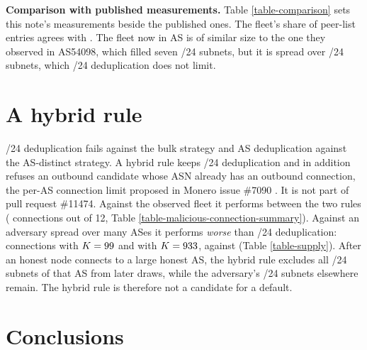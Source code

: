 \documentclass[english]{mrl}
\theoremstyle{plain}
\begin{document}
\textbf{Comparison with published measurements.} Table \ref{table-comparison} sets this note's measurements beside the published ones. The fleet's share of peer-list entries agrees with \cite{Kopyciok2026}. The fleet now in AS\spyTopAsnNew{} is of similar size to the one they observed in AS54098, which filled seven /24 subnets, but it is spread over \spyTwentyFourNew{} /24 subnets, which /24 deduplication does not limit.



\section{A hybrid rule\label{sec:hybrid}}

/24 deduplication fails against the bulk strategy and AS deduplication against the AS-distinct strategy. A hybrid rule keeps /24 deduplication and in addition refuses an outbound candidate whose ASN already has an outbound connection, the per-AS connection limit proposed in Monero issue \#7090 \cite{MoneroIssue7090}. It is not part of pull request \#11474. Against the observed fleet it performs between the two rules (\simNewHybridEightyMean{} connections out of 12, Table \ref{table-malicious-connection-summary}). Against an adversary spread over many ASes it performs \emph{worse} than /24 deduplication: \supHybridKXCIX{} connections with $K=99$ and \supHybridKCMXXXIII{} with $K=933$, against \supSubnetKIX{} (Table \ref{table-supply}). After an honest node connects to a large honest AS, the hybrid rule excludes all /24 subnets of that AS from later draws, while the adversary's /24 subnets elsewhere remain. The hybrid rule is therefore not a candidate for a default.

\section{Conclusions}
\end{document}
